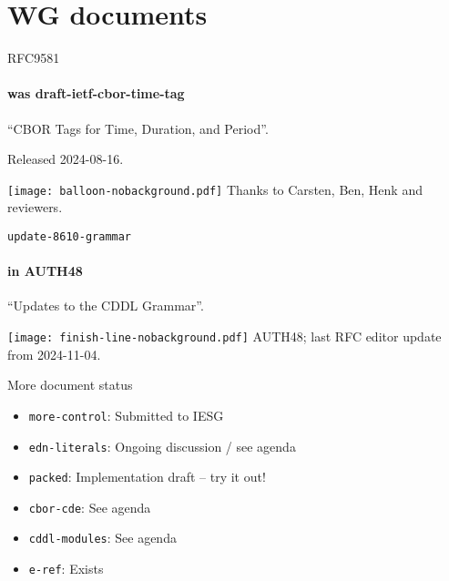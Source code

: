 \documentclass[aspectratio=169]{beamer}
\begin{document}
\section*{WG documents}

\begin{frame}{RFC9581}\Large
        \framesubtitle{was draft-ietf-cbor-time-tag}

        ``CBOR Tags for Time, Duration, and Period''.

        \bigskip

        Released 2024-08-16.

        \begin{block}{\texttt{[image: balloon-nobackground.pdf]}\mbox{\quad}}
                Thanks to Carsten, Ben, Henk and reviewers.
        \end{block}
\end{frame}

\begin{frame}{\texttt{update-8610-grammar}}\Large
        \framesubtitle{in AUTH48}

        ``Updates to the CDDL Grammar''.

        \bigskip

        \begin{block}{\texttt{[image: finish-line-nobackground.pdf]}\mbox{\quad}}
                AUTH48; last RFC editor update from 2024-11-04.
        \end{block}
\end{frame}

%
%
%
%

\begin{frame}{More document status}\Large
    \begin{itemize}
        \item \texttt{more-control}: Submitted to IESG
        \item \texttt{edn-literals}: Ongoing discussion / see agenda
        \item \texttt{packed}: Implementation draft -- try it out!
        \item \texttt{cbor-cde}: See agenda
        \item \texttt{cddl-modules}: See agenda
        \item \texttt{e-ref}: Exists
    \end{itemize}
\end{frame}
\end{document}
